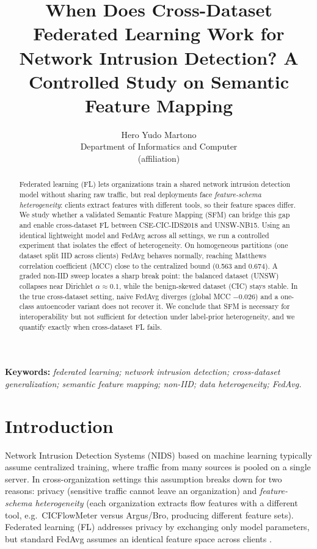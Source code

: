 \documentclass[11pt,a4paper]{article}
\title{\textbf{When Does Cross-Dataset Federated Learning Work for Network
Intrusion Detection? A Controlled Study on Semantic Feature Mapping}}
\author{Hero Yudo Martono\\
\small Department of Informatics and Computer\\
\small (affiliation)}
\date{}
\begin{document}
\maketitle

\begin{abstract}
\noindent
Federated learning (FL) lets organizations train a shared network intrusion
detection model without sharing raw traffic, but real deployments face
\emph{feature-schema heterogeneity}: clients extract features with different
tools, so their feature spaces differ. We study whether a validated Semantic
Feature Mapping (SFM) can bridge this gap and enable cross-dataset FL between
CSE-CIC-IDS2018 and UNSW-NB15. Using an identical lightweight model and FedAvg
across all settings, we run a controlled experiment that isolates the effect of
heterogeneity. On homogeneous partitions (one dataset split IID across clients)
FedAvg behaves normally, reaching Matthews correlation coefficient (MCC) close to
the centralized bound (0.563 and 0.674). A graded non-IID sweep locates a sharp
break point: the balanced dataset (UNSW) collapses near Dirichlet
\(\alpha\approx0.1\), while the benign-skewed dataset (CIC) stays stable. In the
true cross-dataset setting, naive FedAvg diverges (global MCC \(-0.026\)) and a
one-class autoencoder variant does not recover it. We conclude that SFM is
necessary for interoperability but not sufficient for detection under label-prior
heterogeneity, and we quantify exactly when cross-dataset FL fails.
\end{abstract}

\noindent\textbf{Keywords:} \emph{federated learning; network intrusion
detection; cross-dataset generalization; semantic feature mapping; non-IID;
data heterogeneity; FedAvg.}

\vspace{1em}

\section{Introduction}
Network Intrusion Detection Systems (NIDS) based on machine learning typically
assume centralized training, where traffic from many sources is pooled on a
single server. In cross-organization settings this assumption breaks down for two
reasons: privacy (sensitive traffic cannot leave an organization) and
\emph{feature-schema heterogeneity} (each organization extracts flow features with
a different tool, e.g.\ CICFlowMeter versus Argus/Bro, producing different feature
sets). Federated learning (FL) addresses privacy by exchanging only model
parameters, but standard FedAvg assumes an identical feature space across clients
\cite{mcmahan,ref-fl-survey}.
\end{document}
